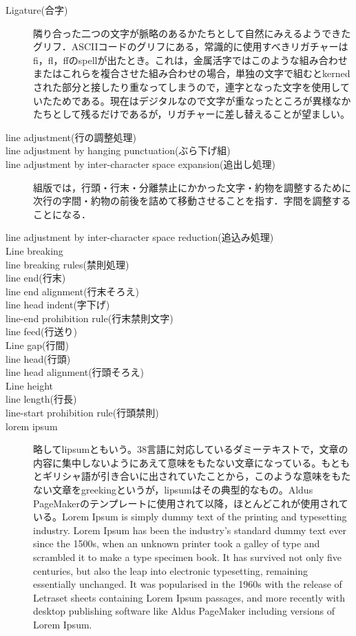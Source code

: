 \begin{description}
    \item[Ligature(合字)]隣り合った二つの文字が脈略のあるかたちとして自然にみえるようできたグリフ．ASCIIコードのグリフにある，常識的に使用すべきリガチャーはfi，fl，ffのspellが出たとき。これは，金属活字ではこのような組み合わせまたはこれらを複合させた組み合わせの場合，単独の文字で組むとkernedされた部分と接したり重なってしまうので，連字となった文字を使用していたためである。現在はデジタルなので文字が重なったところが異様なかたちとして残るだけであるが，リガチャーに差し替えることが望ましい\cite{handbook_of_typography}。
    \item[line adjustment(行の調整処理)]
    \item[line adjustment by hanging punctuation(ぶら下げ組)]
    \item[line adjustment by inter-character space expansion(追出し処理)] 組版では，行頭・行末・分離禁止にかかった文字・約物を調整するために次行の字間・約物の前後を詰めて移動させることを指す．字間を調整することになる\cite{www.jpp.co.jp:yougo/a1.html}．
    \item[line adjustment by inter-character space reduction(追込み処理)]
    \item[Line breaking]
    \item[line breaking rules(禁則処理)]
    \item[line end(行末)]
    \item[line end alignment(行末そろえ)]
    \item[line head indent(字下げ)]
    \item[line-end prohibition rule(行末禁則文字)]
    \item[line feed(行送り)]
    \item[Line gap(行間)]
    \item[line head(行頭)]
    \item[line head alignment(行頭そろえ)]
    \item[Line height]
    \item[line length(行長)]
    \item[line-start prohibition rule(行頭禁則)]
    \item[lorem ipsum]略してlipsumともいう。38言語に対応しているダミーテキストで，文章の内容に集中しないようにあえて意味をもたない文章になっている。もともとギリシャ語が引き合いに出されていたことから，このような意味をもたない文章をgreekingというが，lipsumはその典型的なもの。Aldus PageMakerのテンプレートに使用されて以降，ほとんどこれが使用されている\cite{handbook_of_typography}。Lorem Ipsum is simply dummy text of the printing and typesetting industry. Lorem Ipsum has been the industry's standard dummy text ever since the 1500s, when an unknown printer took a galley of type and scrambled it to make a type specimen book. It has survived not only five centuries, but also the leap into electronic typesetting, remaining essentially unchanged. It was popularised in the 1960s with the release of Letraset sheets containing Lorem Ipsum passages, and more recently with desktop publishing software like Aldus PageMaker including versions of Lorem Ipsum\cite{www.lipsum.com}.

\end{description}
